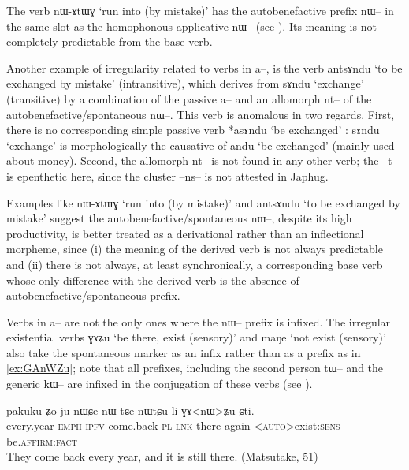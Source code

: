 \documentclass[oldfontcommands,oneside,a4paper,11pt]{article}
\newcommand{\ipa}[1]{{\phon \mbox{#1}}} %
\begin{document}
The verb \ipa{nɯ-ɤtɯɣ}  `run into (by mistake)'  has the autobenefactive prefix \ipa{nɯ--} in the same slot as the homophonous applicative \ipa{nɯ--} (see \citealt{jacques13tropative}). Its meaning   is not completely predictable from the base verb.

Another example of irregularity related to verbs in \ipa{a--}, is the verb \ipa{antsɤndu} `to be exchanged by mistake' (intransitive), which derives from   \ipa{sɤndu} `exchange' (transitive) by a combination of the passive \ipa{a--} and an allomorph \ipa{nt--} of the autobenefactive/spontaneous \ipa{nɯ--}. This verb is anomalous in two regards. First, there is no corresponding simple passive verb *\ipa{asɤndu} `be exchanged' : \ipa{sɤndu} `exchange' is morphologically the causative of \ipa{andu} `be exchanged' (mainly used about money). Second, the allomorph \ipa{nt--} is not found in any other verb; the \ipa{--t--} is epenthetic here, since the cluster \ipa{--ns--} is not attested in Japhug.

Examples like \ipa{nɯ-ɤtɯɣ}  `run into (by mistake)' and \ipa{antsɤndu} `to be exchanged by mistake'   suggest the autobenefactive/spontaneous \ipa{nɯ--}, despite its high productivity, is better treated as a derivational rather than an inflectional morpheme, since (i) the meaning of the derived verb is not always predictable and (ii) there is not always, at least synchronically, a corresponding base verb whose only difference with the derived verb is the absence of autobenefactive/spontaneous prefix.
 
Verbs in \ipa{a--} are not the only ones where the \ipa{nɯ--} prefix is infixed. The irregular existential verbs \ipa{ɣɤʑu} `be there, exist (sensory)'  and \ipa{maŋe} `not exist (sensory)' also take  the spontaneous marker as an infix rather than as a prefix as in \ref{ex:GAnWZu}; note that all prefixes, including the second person \ipa{tɯ--} and the generic \ipa{kɯ--} are infixed in the conjugation of these verbs (see \citealt{jacques12agreement, jacques15generic}).
\begin{exe}
\ex \label{ex:GAnWZu}
\gll 
 \ipa{pakuku}  	\ipa{ʑo}  	\ipa{ju-nɯɕe-nɯ}  	\ipa{tɕe}  	\ipa{nɯtɕu}  	\ipa{li}  	\ipa{ɣɤ<nɯ>ʑu}  	\ipa{ɕti.}  	\\
 every.year \textsc{emph} \textsc{ipfv}-come.back-\textsc{pl} \textsc{lnk} there again <\textsc{auto}>exist:\textsc{sens} be.\textsc{affirm:fact} \\
 \glt They come back every year, and it is still there. (Matsutake, 51)
\end{exe}
\end{document}
